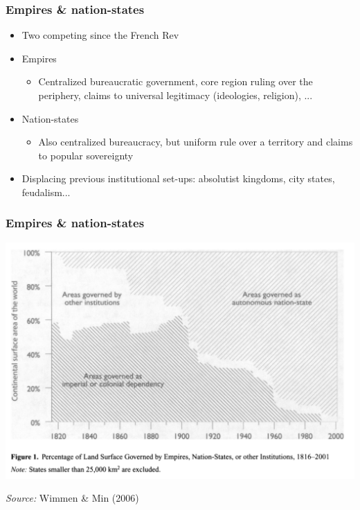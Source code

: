 \documentclass[aspectratio=43, handout]{beamer}
\begin{document}
\begin{frame}
\frametitle{Empires \& nation-states}
\centering

\begin{itemize}
  \item Two competing  since the French Rev
  \item Empires
  \begin{itemize}
    \item Centralized bureaucratic government, core region ruling over the periphery, claims to universal legitimacy (ideologies, religion), ...
  \end{itemize}
  \item Nation-states
  \begin{itemize}
    \item Also centralized bureaucracy, but uniform rule over a territory and claims to popular sovereignty
  \end{itemize}
  \item Displacing previous institutional set-ups: absolutist kingdoms, city states, feudalism...
\end{itemize}

\end{frame}

\begin{frame}
\frametitle{Empires \& nation-states}
\centering

\includegraphics[width = \textwidth]{img/wimmer_min_fig1}

{\scriptsize \textit{Source:} Wimmen \& Min (2006)}

\end{frame}
\end{document}

